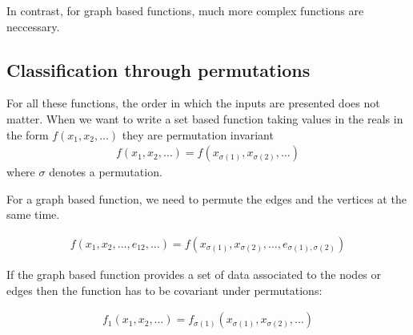 \documentclass[reprint,twocolumn,amsmath,amssymb,aps]{revtex4-1}
\begin{document}
In contrast, for graph based functions, much more complex functions are neccessary.

\subsection{Classification through permutations}

For all these functions, the order in which the inputs are presented does not matter. When we want to write a set based function taking values in the reals in the form $f(x_1, x_2, \dots)$ they are permutation invariant
\begin{align}
f(x_1, x_2, \dots) = f(x_{\sigma(1)}, x_{\sigma(2)}, \dots)
\end{align}
where $\sigma$ denotes a permutation.

For a graph based function, we need to permute the edges and the vertices at the same time.

\begin{align}
f(x_1, x_2, \dots, e_{12}, \dots) = f(x_{\sigma(1)}, x_{\sigma(2)}, \dots, e_{\sigma(1),\sigma(2)})
\end{align}

If the graph based function provides a set of data associated to the nodes or edges then the function has to be covariant under permutations:

\begin{align}
f_1(x_1, x_2, \dots) = f_{\sigma(1)}(x_{\sigma(1)}, x_{\sigma(2)}, \dots)
\end{align}
\end{document}
